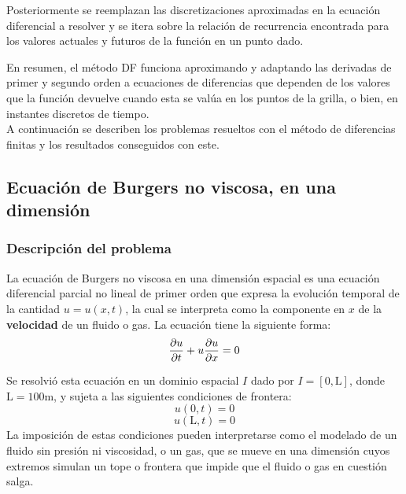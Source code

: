 \documentclass[12pt]{article}
\begin{document}
	Posteriormente se reemplazan las discretizaciones aproximadas en la ecuación diferencial a resolver y se itera sobre la relación de recurrencia encontrada para los valores actuales y futuros de la función en un punto dado. 
	
	En resumen, el método DF funciona aproximando y adaptando las derivadas de primer y segundo orden a ecuaciones de diferencias que dependen de los valores que la función devuelve cuando esta se valúa en los puntos de la grilla, o bien, en instantes discretos de tiempo.\\
	
	A continuación se describen los problemas resueltos con el método de diferencias finitas y los resultados conseguidos con este.

	
	\subsection{Ecuación de Burgers no viscosa, en una dimensión}
	\label{sec:burgers1ddf}
	\subsubsection{Descripción del problema}
	La ecuación de Burgers no viscosa en una dimensión espacial es una ecuación diferencial parcial no lineal de primer orden que expresa la evolución temporal de la cantidad $u = u(x,t)$, la cual se interpreta como la componente en $x$ de la \textbf{velocidad} de un fluido o gas. La ecuación tiene la siguiente forma:
	\begin{equation}
		\pdv{u}{t}+u\pdv{u}{x}=0
		\label{eq:burgers1d}
	\end{equation}
	
	Se resolvió esta ecuación en un dominio espacial $I$ dado por $I = [0,\text{L}]$, donde $\text{L} = 100 \unit{\meter}$, y sujeta a las siguientes condiciones de frontera:\\
	\begin{equation}
		u(0,t)=0
	\end{equation}
	\begin{equation}
		u(\text{L},t)= 0
	\end{equation}
	La imposición de estas condiciones pueden interpretarse como el modelado de un fluido sin presión ni viscosidad, o un gas, que se mueve en una dimensión cuyos extremos simulan un tope o frontera que impide que el fluido o gas en cuestión salga. 
	
\end{document}
